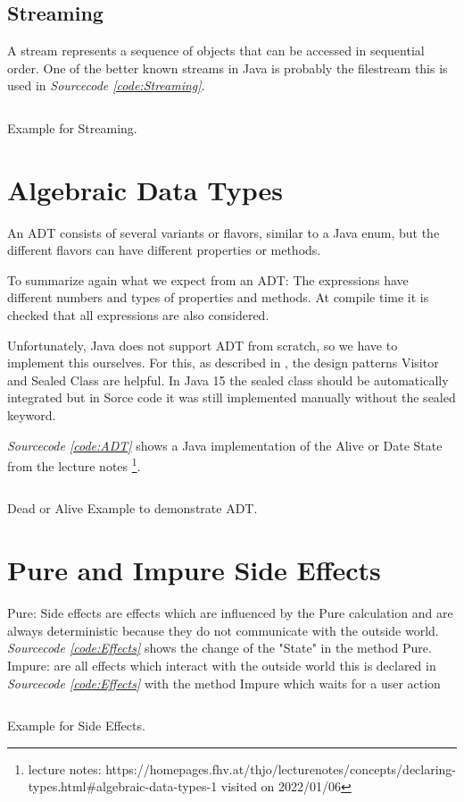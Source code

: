 \documentclass[a4paper,12pt,twoside]{scrreprt}
\begin{document}
\subsection{Streaming}
A stream represents a sequence of objects that can be accessed in sequential order.
One of the better known streams in Java is probably the filestream this is used in \emph{Sourcecode \ref{code:Streaming}}.
\begin{listing}[ht]
    \inputminted[fontsize=\footnotesize,linenos]{java}{./code/Streaming.java}
    \caption[Example for Streaming]{Example for Streaming.}
    \label{code:Streaming}
\end{listing}
\clearpage
\section{Algebraic Data Types}
An \ac{ADT} consists of several variants or flavors, similar to a Java enum, but the different flavors can have different properties or methods.

To summarize again what we expect from an \ac{ADT}:
The expressions have different numbers and types of properties and methods.
At compile time it is checked that all expressions are also considered.

Unfortunately, Java does not support ADT from scratch, so we have to implement this ourselves. For this, as described in \cite{MAINIERO_algebraic_2020}, the design patterns Visitor and Sealed Class are helpful. In Java 15 the sealed class should be automatically integrated but in Sorce code it was still implemented manually without the sealed keyword.

\emph{Sourcecode \ref{code:ADT}} shows a Java implementation of the Alive or Date State from the lecture notes \footnote{ lecture notes: https://homepages.fhv.at/thjo/lecturenotes/concepts/declaring-types.html\#algebraic-data-types-1 visited on 2022/01/06}.
\begin{listing}[ht]
    \inputminted[fontsize=\footnotesize,linenos]{java}{./code/ADT.java}
    \caption[Example for a \ac{ADT}]{Dead or Alive Example to demonstrate \ac{ADT}.}
    \label{code:ADT}
\end{listing}
\clearpage


\section{Pure and Impure Side Effects}
Pure: Side effects are effects which are influenced by the Pure calculation and are always deterministic because they do not communicate with the outside world. \emph{Sourcecode \ref{code:Effects}} shows the change of the "State" in the method Pure.
\newline
Impure: are all effects which interact with the outside world this is declared in \emph{Sourcecode \ref{code:Effects}} with the method Impure which waits for a user action
\begin{listing}[ht]
    \inputminted[fontsize=\footnotesize,linenos]{java}{./code/SideEffects.java}
    \caption[Example for Side Effects]{Example for Side Effects.}
    \label{code:Effects}
\end{listing}
\clearpage

\clearpage
{}
{}
\printbibliography
\end{document}
